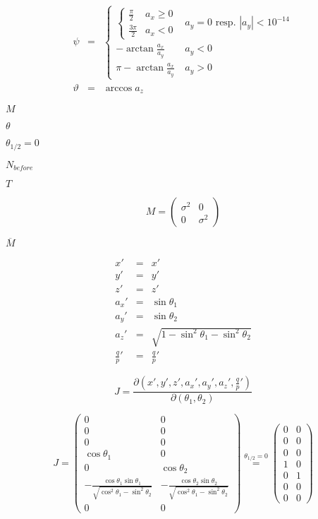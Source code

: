 \documentclass{article}
\begin{document}
\begin{eqnarray*} \psi & = & \begin{cases} \begin{cases} \frac{\pi}{2} & a_{x} \geq 0 \\ \frac{3\pi}{2} & a_{x} < 0 \end{cases} & a_{y}=0 \mbox{ resp. } |a_{y}|<10^{-14} \\ - \arctan \frac{a_{x}}{a_{y}} & a_{y} < 0 \\ \pi - \arctan \frac{a_{x}}{a_{y}} & a_{y} > 0 \end{cases} \\ \vartheta & = & \arccos a_{z} \end{eqnarray*}
\pagebreak

$M$
\pagebreak

$\theta$
\pagebreak

$\theta_{1/2}=0$
\pagebreak

$N_{before}$
\pagebreak

$T$
\pagebreak

\[ M=\left(\begin{array}{cc} \sigma^{2} & 0\\ 0 & \sigma^{2}\end{array}\right)\]
\pagebreak

$\overline{M}$
\pagebreak

\begin{eqnarray*} x' & = & x'\\ y' & = & y'\\ z' & = & z'\\ a_{x}' & = & \sin\theta_{1}\\ a_{y}' & = & \sin\theta_{2}\\ a_{z}' & = & \sqrt{1-\sin^{2}\theta_{1}-\sin^{2}\theta_{2}}\\ \frac{q}{p}' & = & \frac{q}{p}'\end{eqnarray*}
\pagebreak

\[ J=\frac{\partial\left(x',y',z',a_{x}',a_{y}',a_{z}',\frac{q}{p}'\right)}{\partial\left(\theta_{1},\theta_{2}\right)}\]
\pagebreak

\[ J=\left(\begin{array}{cc} 0 & 0\\ 0 & 0\\ 0 & 0\\ \cos\theta_{1} & 0\\ 0 & \cos\theta_{2}\\ -\frac{\cos\theta_{1}\sin\theta_{1}}{\sqrt{\cos^{2}\theta_{1}-\sin^{2}\theta_{2}}} & -\frac{\cos\theta_{2}\sin\theta_{2}}{\sqrt{\cos^{2}\theta_{1}-\sin^{2}\theta_{2}}}\\ 0 & 0\end{array}\right) \overset{\theta_{1/2}=0}{=} \left(\begin{array}{cc} 0 & 0\\ 0 & 0\\ 0 & 0\\ 1 & 0\\ 0 & 1\\ 0 & 0\\ 0 & 0\end{array}\right)\]
\pagebreak
\end{document}
